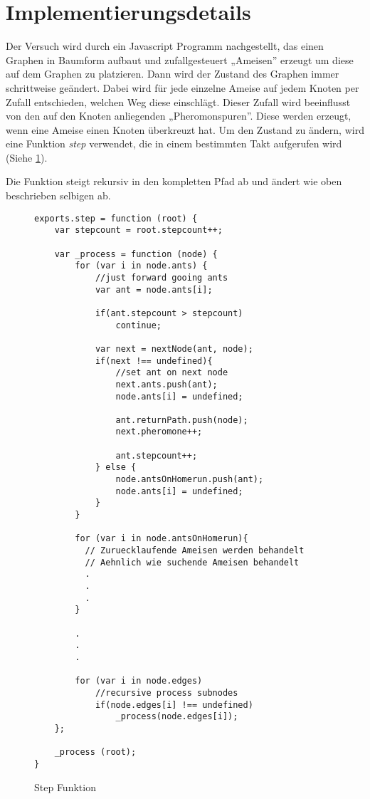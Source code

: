 
\section{Implementierungsdetails}

Der Versuch wird durch ein Javascript Programm nachgestellt, das einen
Graphen in Baumform aufbaut und zufallgesteuert „Ameisen” erzeugt um
diese auf dem Graphen zu platzieren. Dann wird der Zustand des Graphen
immer schrittweise geändert. Dabei wird für jede einzelne Ameise auf
jedem Knoten per Zufall entschieden, welchen Weg diese
einschlägt. Dieser Zufall wird beeinflusst von den auf den Knoten
anliegenden „Pheromonspuren”. Diese werden erzeugt, wenn eine Ameise
einen Knoten überkreuzt hat. Um den Zustand zu ändern, wird eine
Funktion \emph{step} verwendet, die in einem bestimmten Takt
aufgerufen wird (Siehe \ref{fig:stepfn}).

Die Funktion steigt rekursiv in den kompletten Pfad ab und ändert wie
oben beschrieben selbigen ab.

\begin{figure}[htbp]
  \centering

\begin{lstlisting}
exports.step = function (root) {
    var stepcount = root.stepcount++;

    var _process = function (node) {
        for (var i in node.ants) {
            //just forward gooing ants
            var ant = node.ants[i];

            if(ant.stepcount > stepcount)
                continue;

            var next = nextNode(ant, node);
            if(next !== undefined){
                //set ant on next node
                next.ants.push(ant);
                node.ants[i] = undefined;

                ant.returnPath.push(node);
                next.pheromone++;

                ant.stepcount++;
            } else {
                node.antsOnHomerun.push(ant);
                node.ants[i] = undefined;
            }
        }

        for (var i in node.antsOnHomerun){
          // Zuruecklaufende Ameisen werden behandelt
          // Aehnlich wie suchende Ameisen behandelt
          .
          .
          .
        }

        .
        .
        .

        for (var i in node.edges)
            //recursive process subnodes
            if(node.edges[i] !== undefined)
                _process(node.edges[i]);
    };

    _process (root);
}
\end{lstlisting}
  \caption{Step Funktion}
  \label{fig:stepfn}
\end{figure}

